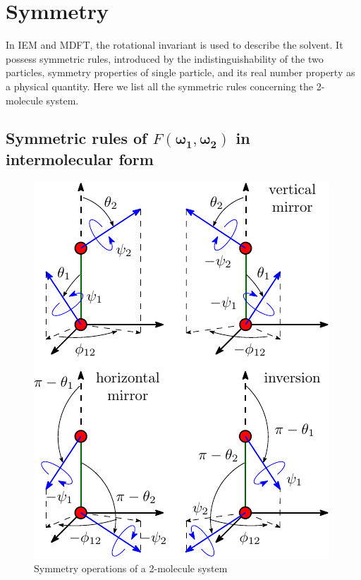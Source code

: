 \section{Symmetry}

In IEM and MDFT, the rotational invariant is used to describe the
solvent. It possess symmetric rules, introduced by the indistinguishability
of the two particles, symmetry properties of single particle, and its
real number property as a physical quantity. Here we list all the symmetric
rules concerning the 2-molecule system.


\subsection{Symmetric rules of $F(\boldsymbol{\omega_{1}},\boldsymbol{\omega_{2}})$
in intermolecular form}

\begin{figure}[h]
\begin{centering}
\includegraphics{_figure/symmetry_dcf}
\par\end{centering}

\caption{Symmetry operations of a 2-molecule system\label{fig:Symmetry-operations}}
\end{figure}


